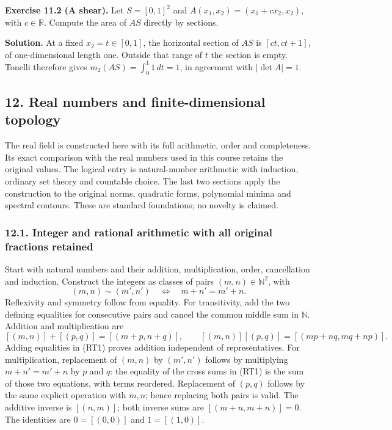 \documentclass[
  11pt,
]{article}
\begin{document}
\textbf{Exercise 11.2 (A shear).} Let \(S=[0,1]^2\) and
\(A(x_1,x_2)=(x_1+c x_2,x_2)\), with \(c\in\mathbb R\). Compute the area
of \(AS\) directly by sections.

\textbf{Solution.} At a fixed \(x_2=t\in[0,1]\), the horizontal section
of \(AS\) is \([ct,ct+1]\), of one-dimensional length one. Outside that
range of \(t\) the section is empty. Tonelli therefore gives
\(m_2(AS)=\int_0^1 1\,dt=1\), in agreement with \(|\det A|=1\).

\subsection{12. Real numbers and finite-dimensional
topology}\label{real-numbers-and-finite-dimensional-topology}

The real field is constructed here with its full arithmetic, order and
completeness. Its exact comparison with the real numbers used in this
course retains the original values. The logical entry is natural-number
arithmetic with induction, ordinary set theory and countable choice. The
last two sections apply the construction to the original norms,
quadratic forms, polynomial minima and spectral contours. These are
standard foundations; no novelty is claimed.

\subsubsection{12.1. Integer and rational arithmetic with all original
fractions
retained}\label{integer-and-rational-arithmetic-with-all-original-fractions-retained}

Start with natural numbers and their addition, multiplication, order,
cancellation and induction. Construct the integers as classes of pairs
\((m,n)\in\mathbb N^2\), with \[
(m,n)\sim(m',n')\quad\Longleftrightarrow\quad m+n'=m'+n.
\tag{RT1}
\] Reflexivity and symmetry follow from equality. For transitivity, add
the two defining equalities for consecutive pairs and cancel the common
middle sum in \(\mathbb N\). Addition and multiplication are \[
[(m,n)]+[(p,q)]=[(m+p,n+q)],\qquad
[(m,n)][(p,q)]=[(mp+nq,mq+np)].
\tag{RT2}
\] Adding equalities in (RT1) proves addition independent of
representatives. For multiplication, replacement of \((m,n)\) by
\((m',n')\) follows by multiplying \(m+n'=m'+n\) by \(p\) and \(q\): the
equality of the cross sums in (RT1) is the sum of those two equations,
with terms reordered. Replacement of \((p,q)\) follows by the same
explicit operation with \(m,n\); hence replacing both pairs is valid.
The additive inverse is \([(n,m)]\); both inverse sums are
\([(m+n,m+n)]=0\). The identities are \(0=[(0,0)]\) and \(1=[(1,0)]\).
\end{document}
